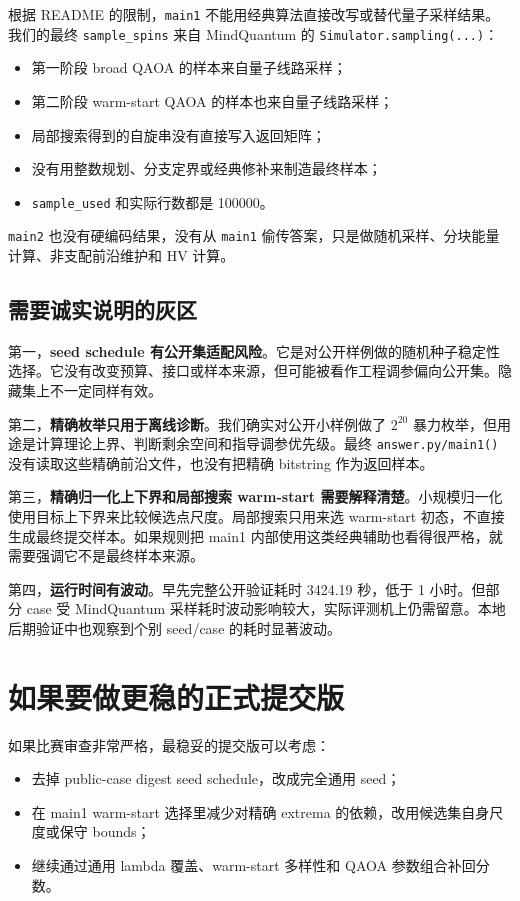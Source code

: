 \documentclass[UTF8,zihao=-4]{ctexart}
\newcommand{\code}[1]{\texttt{#1}}
\begin{document}
根据 README 的限制，\code{main1} 不能用经典算法直接改写或替代量子采样结果。我们的最终 \code{sample\_spins} 来自 MindQuantum 的 \code{Simulator.sampling(...)}：

\begin{itemize}
  \item 第一阶段 broad QAOA 的样本来自量子线路采样；
  \item 第二阶段 warm-start QAOA 的样本也来自量子线路采样；
  \item 局部搜索得到的自旋串没有直接写入返回矩阵；
  \item 没有用整数规划、分支定界或经典修补来制造最终样本；
  \item \code{sample\_used} 和实际行数都是 100000。
\end{itemize}

\code{main2} 也没有硬编码结果，没有从 \code{main1} 偷传答案，只是做随机采样、分块能量计算、非支配前沿维护和 HV 计算。

\subsection{需要诚实说明的灰区}

第一，\textbf{seed schedule 有公开集适配风险}。它是对公开样例做的随机种子稳定性选择。它没有改变预算、接口或样本来源，但可能被看作工程调参偏向公开集。隐藏集上不一定同样有效。

第二，\textbf{精确枚举只用于离线诊断}。我们确实对公开小样例做了 \(2^{20}\) 暴力枚举，但用途是计算理论上界、判断剩余空间和指导调参优先级。最终 \code{answer.py/main1()} 没有读取这些精确前沿文件，也没有把精确 bitstring 作为返回样本。

第三，\textbf{精确归一化上下界和局部搜索 warm-start 需要解释清楚}。小规模归一化使用目标上下界来比较候选点尺度。局部搜索只用来选 warm-start 初态，不直接生成最终提交样本。如果规则把 main1 内部使用这类经典辅助也看得很严格，就需要强调它不是最终样本来源。

第四，\textbf{运行时间有波动}。早先完整公开验证耗时 3424.19 秒，低于 1 小时。但部分 case 受 MindQuantum 采样耗时波动影响较大，实际评测机上仍需留意。本地后期验证中也观察到个别 seed/case 的耗时显著波动。

\section{如果要做更稳的正式提交版}

如果比赛审查非常严格，最稳妥的提交版可以考虑：

\begin{itemize}
  \item 去掉 public-case digest seed schedule，改成完全通用 seed；
  \item 在 main1 warm-start 选择里减少对精确 extrema 的依赖，改用候选集自身尺度或保守 bounds；
  \item 继续通过通用 lambda 覆盖、warm-start 多样性和 QAOA 参数组合补回分数。
\end{itemize}
\end{document}
